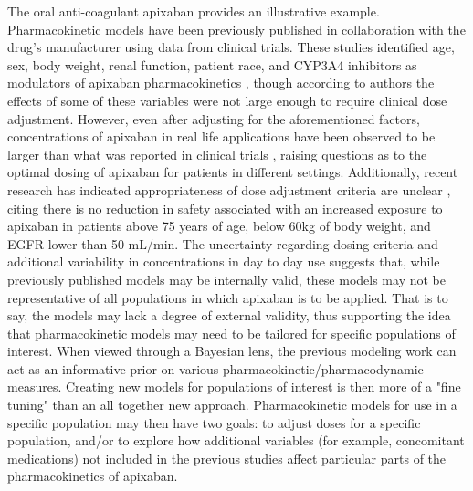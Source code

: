 The oral anti-coagulant apixaban provides an illustrative example.  Pharmacokinetic models have been previously published \cite{cirincione2018population,ueshima2018population} in collaboration with the drug's manufacturer using data from clinical trials.  These studies identified age, sex, body weight, renal function,  patient race, and CYP3A4 inhibitors as modulators of apixaban pharmacokinetics \cite{cirincione2018population}, though according to authors the effects of some of these variables were not large enough to require clinical dose adjustment. However, even after adjusting for the aforementioned factors, concentrations of apixaban in real life applications have been observed to be larger than what was reported in clinical trials \cite{sukumar2019apixaban}, raising questions as to the optimal dosing of apixaban for patients in different settings. Additionally, recent research has indicated appropriateness of dose adjustment criteria are unclear \cite{vu2021critical}, citing there is no reduction in safety associated with an increased exposure to apixaban in patients above 75 years of age, below 60kg of body weight, and EGFR lower than 50 mL/min. The uncertainty regarding dosing criteria and additional variability in concentrations in day to day use suggests that, while previously published models may be internally valid, these models may not be representative of all populations in which apixaban is to be applied.  That is to say, the models may lack a degree of external validity, thus supporting the idea that pharmacokinetic models may need to be tailored for specific populations of interest. When viewed through a Bayesian lens, the previous modeling work can act as an informative prior on various pharmacokinetic/pharmacodynamic measures.  Creating new models for populations of interest is then more of a "fine tuning" than an all together new approach.  Pharmacokinetic models for use in a specific population may then have two goals:  to adjust doses for a specific population, and/or to explore how additional variables (for example, concomitant medications) not included in the previous studies affect particular parts of the pharmacokinetics of apixaban.  

